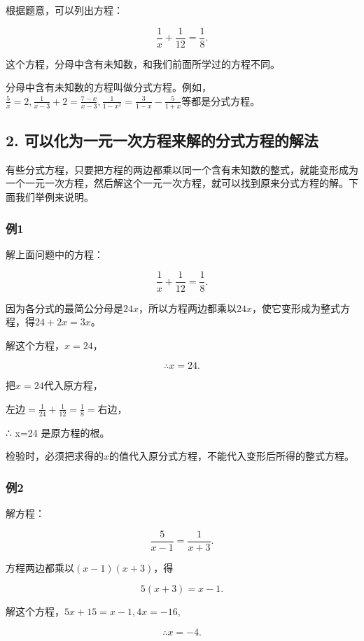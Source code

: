 根据题意，可以列出方程：

\[
\frac{1}{x} + \frac{1}{12} = \frac{1}{8}.
\]

这个方程，分母中含有未知数，和我们前面所学过的方程不同。

分母中含有未知数的方程叫做分式方程。例如，\(\frac{5}{x} = 2, \frac{1}{x - 3} + 2 = \frac{7 - x}{x - 3}, \frac{1}{1 - x^2} = \frac{3}{1 - x} - \frac{5}{1 + x}\)等都是分式方程。

\subsection{2. 可以化为一元一次方程来解的分式方程的解法}

有些分式方程，只要把方程的两边都乘以同一个含有未知数的整式，就能变形成为一个一元一次方程，然后解这个一元一次方程，就可以找到原来分式方程的解。下面我们举例来说明。

\subsubsection{例1}

解上面问题中的方程：

\[
\frac{1}{x} + \frac{1}{12} = \frac{1}{8}.
\]

因为各分式的最简公分母是\(24x\)，所以方程两边都乘以\(24x\)，使它变形成为整式方程，得\(24 + 2x = 3x\)。

解这个方程，\(x = 24\)，

\[
\therefore x = 24.
\]

 把\(x = 24\)代入原方程，

左边\(= \frac{1}{24} +\frac{1}{12} = \frac{1}{8} =\)右边，

∴ x=24 是原方程的根。

检验时，必须把求得的\(x\)的值代入原分式方程，不能代入变形后所得的整式方程。

\subsubsection{例2}

解方程：

\[
\frac{5}{x - 1} = \frac{1}{x + 3}.
\]

 方程两边都乘以\((x - 1)(x + 3)\)，得

\[
5 (x + 3) = x - 1.
\]

解这个方程，\(5x + 15 = x - 1, 4x = -16,\)

\[
\therefore x = - 4.
\]

